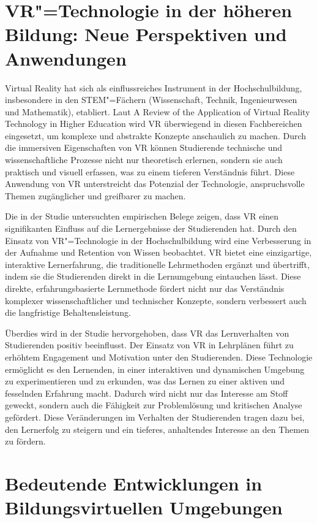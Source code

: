 \documentclass[draft]{vutinfth} %
\begin{document}
\section{VR"=Technologie in der höheren Bildung: Neue Perspektiven und Anwendungen}

Virtual Reality hat sich als einflussreiches Instrument in der Hochschulbildung, insbesondere in den STEM"=Fächern (Wissenschaft, Technik, Ingenieurwesen und Mathematik), etabliert. Laut \glqq A Review of the Application of Virtual Reality Technology in Higher Education\grqq\cite{ding2022review} wird VR überwiegend in diesen Fachbereichen eingesetzt, um komplexe und abstrakte Konzepte anschaulich zu machen. Durch die immersiven Eigenschaften von VR können Studierende technische und wissenschaftliche Prozesse nicht nur theoretisch erlernen, sondern sie auch praktisch und visuell erfassen, was zu einem tieferen Verständnis führt. Diese Anwendung von VR unterstreicht das Potenzial der Technologie, anspruchsvolle Themen zugänglicher und greifbarer zu machen.

Die in der Studie untersuchten empirischen Belege zeigen, dass VR einen signifikanten Einfluss auf die Lernergebnisse der Studierenden hat. Durch den Einsatz von VR"=Technologie in der Hochschulbildung wird eine Verbesserung in der Aufnahme und Retention von Wissen beobachtet. VR bietet eine einzigartige, interaktive Lernerfahrung, die traditionelle Lehrmethoden ergänzt und übertrifft, indem sie die Studierenden direkt in die Lernumgebung eintauchen lässt. Diese direkte, erfahrungsbasierte Lernmethode fördert nicht nur das Verständnis komplexer wissenschaftlicher und technischer Konzepte, sondern verbessert auch die langfristige Behaltensleistung.

Überdies wird in der Studie hervorgehoben, dass VR das Lernverhalten von Studierenden positiv beeinflusst. Der Einsatz von VR in Lehrplänen führt zu erhöhtem Engagement und Motivation unter den Studierenden. Diese Technologie ermöglicht es den Lernenden, in einer interaktiven und dynamischen Umgebung zu experimentieren und zu erkunden, was das Lernen zu einer aktiven und fesselnden Erfahrung macht. Dadurch wird nicht nur das Interesse am Stoff geweckt, sondern auch die Fähigkeit zur Problemlösung und kritischen Analyse gefördert. Diese Veränderungen im Verhalten der Studierenden tragen dazu bei, den Lernerfolg zu steigern und ein tieferes, anhaltendes Interesse an den Themen zu fördern.

\section{Bedeutende Entwicklungen in Bildungsvirtuellen Umgebungen}
\end{document}
